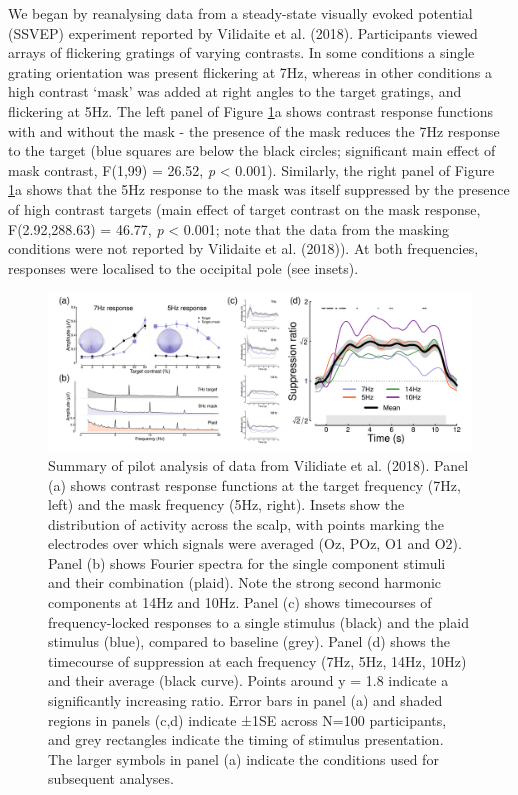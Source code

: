 \documentclass[
]{article}
\begin{document}
We began by reanalysing data from a steady-state visually evoked potential (SSVEP) experiment reported by Vilidaite et al. (2018). Participants viewed arrays of flickering gratings of varying contrasts. In some conditions a single grating orientation was present flickering at 7Hz, whereas in other conditions a high contrast `mask' was added at right angles to the target gratings, and flickering at 5Hz. The left panel of Figure \ref{fig:Pilotdata}a shows contrast response functions with and without the mask - the presence of the mask reduces the 7Hz response to the target (blue squares are below the black circles; significant main effect of mask contrast, F(1,99) = 26.52, \emph{p} \textless{} 0.001). Similarly, the right panel of Figure \ref{fig:Pilotdata}a shows that the 5Hz response to the mask was itself suppressed by the presence of high contrast targets (main effect of target contrast on the mask response, F(2.92,288.63) = 46.77, \emph{p} \textless{} 0.001; note that the data from the masking conditions were not reported by Vilidaite et al. (2018)). At both frequencies, responses were localised to the occipital pole (see insets).

\begin{figure}

{\centering \includegraphics{Figures/VilidaiteData} 

}

\caption{Summary of pilot analysis of data from Vilidiate et al. (2018). Panel (a) shows contrast response functions at the target frequency (7Hz, left) and the mask frequency (5Hz, right). Insets show the distribution of activity across the scalp, with points marking the electrodes over which signals were averaged (Oz, POz, O1 and O2). Panel (b) shows Fourier spectra for the single component stimuli and their combination (plaid). Note the strong second harmonic components at 14Hz and 10Hz. Panel (c) shows timecourses of frequency-locked responses to a single stimulus (black) and the plaid stimulus (blue), compared to baseline (grey). Panel (d) shows the timecourse of suppression at each frequency (7Hz, 5Hz, 14Hz, 10Hz) and their average (black curve). Points around y = 1.8 indicate a significantly increasing ratio. Error bars in panel (a) and shaded regions in panels (c,d) indicate ±1SE across N=100 participants, and grey rectangles indicate the timing of stimulus presentation. The larger symbols in panel (a) indicate the conditions used for subsequent analyses.}\label{fig:Pilotdata}
\end{figure}
\end{document}

